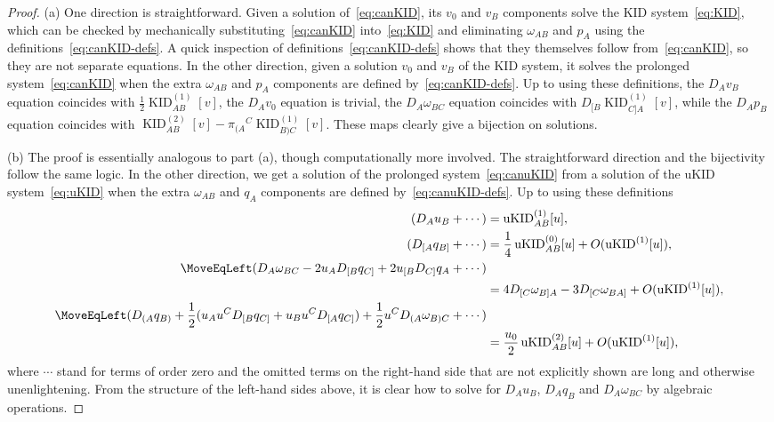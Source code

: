 \documentclass[a4paper]{article}
\theoremstyle{remark}
\newcommand{\KIDi}{\operatorname{KID}^{(1)}}
\newcommand{\KIDii}{\operatorname{KID}^{(2)}}
\newcommand{\uKIDo}{\operatorname{uKID}^{(0)}}
\newcommand{\uKIDi}{\operatorname{uKID}^{(1)}}
\newcommand{\uKIDii}{\operatorname{uKID}^{(2)}}
\begin{document}
\begin{proof}
(a) One direction is straightforward. Given a solution
of~\eqref{eq:canKID}, its $v_0$ and $v_B$ components solve the KID
system~\eqref{eq:KID}, which can be checked by mechanically
substituting~\eqref{eq:canKID} into~\eqref{eq:KID} and eliminating
$\omega_{AB}$ and $p_A$ using the definitions~\eqref{eq:canKID-defs}. A
quick inspection of definitions~\eqref{eq:canKID-defs} shows that they
themselves follow from~\eqref{eq:canKID}, so they are not separate
equations. In the other direction, given a solution $v_0$ and $v_B$ of
the KID system, it solves the prolonged system~\eqref{eq:canKID} when
the extra $\omega_{AB}$ and $p_A$ components are defined
by~\eqref{eq:canKID-defs}. Up to using these definitions, the $D_A v_B$
equation coincides with $\frac{1}{2} \KIDi_{AB}[v]$, the $D_A v_0$
equation is trivial, the $D_A \omega_{BC}$ equation coincides with
$D_{[B} \KIDi_{C]A}[v]$, while the $D_A p_B$ equation coincides with
$\KIDii_{AB}[v] - \pi_{(A}{}^C \KIDi_{B)C}[v]$. These maps clearly give
a bijection on solutions.

(b) The proof is essentially analogous to part (a), though
computationally more involved. The straightforward direction and the
bijectivity follow the same logic. In the other direction, we get a
solution of the prolonged system~\eqref{eq:canuKID} from a solution of
the uKID system~\eqref{eq:uKID} when the extra $\omega_{AB}$ and $q_A$
components are defined by~\eqref{eq:canuKID-defs}. Up to using these
definitions
\begin{align*}
	(D_A u_B + \cdots)
		&= \uKIDi_{AB}[u] , \\
	(D_{[A} q_{B]} + \cdots)
		&= \frac{1}{4} \uKIDo_{AB}[u] + O(\uKIDi[u]) , \\
	\MoveEqLeft
	(D_A \omega_{BC} - 2 u_{A} D_{[B} q_{C]} + 2 u_{[B} D_{C]} q_{A} + \cdots)
		\\
		&= 4 D_{[C} \omega_{B]A}  - 3 D_{[C} \omega_{BA]} + O(\uKIDi[u]) , \\
	\MoveEqLeft
	(D_{(A} q_{B)} + \frac{1}{2} (u_{A} u^C D_{[B} q_{C]} + u_{B} u^C D_{[A} q_{C]}) + \frac{1}{2} u^C D_{(A} \omega_{B)C} + \cdots)
		\\
		&= \frac{u_0}{2} \uKIDii_{AB}[u] + O(\uKIDi[u]) ,
\end{align*}
where $\cdots$ stand for terms of order zero and the omitted terms on
the right-hand side that are not explicitly shown are long and otherwise
unenlightening. From the structure of the left-hand sides above, it is
clear how to solve for $D_A u_B$, $D_A q_B$ and $D_A \omega_{BC}$ by
algebraic operations.
\end{proof}
\end{document}
